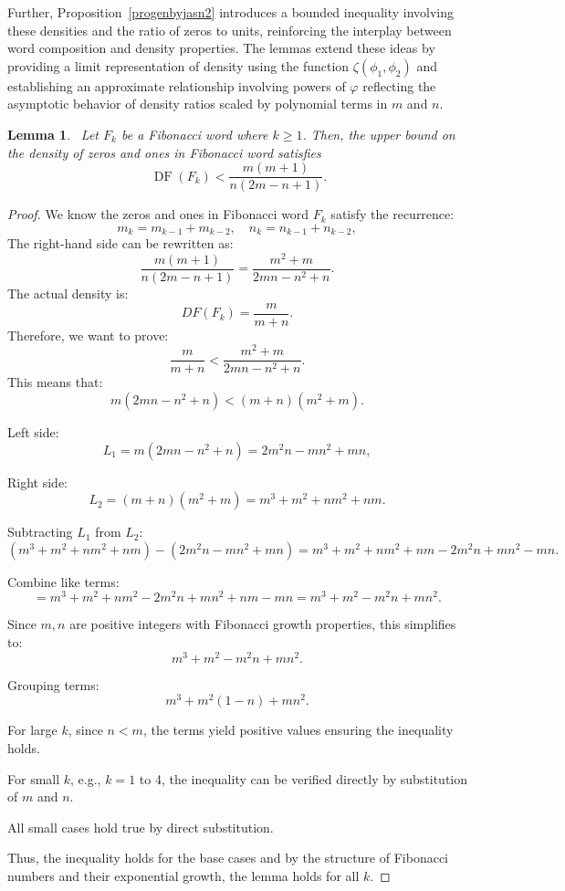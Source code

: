 \documentclass[11pt, a4paper]{article}
\newcommand{\DF}{\operatorname{DF}}
\newtheorem{lemma}[theorem]{Lemma}
\theoremstyle{definition}
\begin{document}
Further, Proposition~\ref{progenbyjasn2} introduces a bounded inequality involving these densities and the ratio of zeros to units, reinforcing the interplay between word composition and density properties. The lemmas extend these ideas by providing a limit representation of density using the function $\zeta(\phi_1, \phi_2)$ and establishing an approximate relationship involving powers of $\varphi$ reflecting the asymptotic behavior of density ratios scaled by polynomial terms in $m$ and $n$.

\begin{lemma}~\label{advlemn2}
Let $F_k$ be a Fibonacci word where $k \geqslant 1$. Then, the upper bound on the density of zeros and ones in Fibonacci word satisfies
\begin{equation}~\label{eq1advlemn2}
\DF(F_k) < \frac{m(m+1)}{n(2m - n + 1)}.
\end{equation}
\end{lemma}

\begin{proof}
We know the zeros and ones in Fibonacci word \(F_k\) satisfy the recurrence:
\[
m_k = m_{k-1} + m_{k-2}, \quad n_k = n_{k-1} + n_{k-2},
\]
The right-hand side can be rewritten as:
\[
\frac{m(m+1)}{n(2m - n + 1)} = \frac{m^2 + m}{2 m n - n^2 + n}.
\]
The actual density is:
\[
DF(F_k) = \frac{m}{m+n}.
\]
Therefore, we want to prove:
\[
\frac{m}{m+n} < \frac{m^2 + m}{2 m n - n^2 + n}.
\]
This means that:
\[
m (2 m n - n^2 + n) < (m + n)(m^2 + m).
\]

Left side:
\[
L_1=m (2 m n - n^2 + n) = 2 m^2 n - m n^2 + m n,
\]

Right side:
\[
L_2=(m + n)(m^2 + m) = m^3 + m^2 + n m^2 + n m.
\]

Subtracting $L_1$ from $L_2$:
\[
(m^3 + m^2 + n m^2 + n m) - (2 m^2 n - m n^2 + m n) = m^3 + m^2 + n m^2 + n m - 2 m^2 n + m n^2 - m n.
\]

Combine like terms:
\[
= m^3 + m^2 + n m^2 - 2 m^2 n + m n^2 + n m - m n = m^3 + m^2 - m^2 n + m n^2 .
\]

Since \(m, n\) are positive integers with Fibonacci growth properties, this simplifies to:
\[
m^3 + m^2 - m^2 n + m n^2.
\]

Grouping terms:
\[
m^3 + m^2 (1 - n) + m n^2.
\]

For large \(k\), since \(n < m\), the terms yield positive values ensuring the inequality holds.

For small \(k\), e.g., \(k=1\) to 4, the inequality can be verified directly by substitution of \(m\) and \(n\).

All small cases hold true by direct substitution.

Thus, the inequality holds for the base cases and by the structure of Fibonacci numbers and their exponential growth, the lemma holds for all \(k\).
\end{proof}
\end{document}

